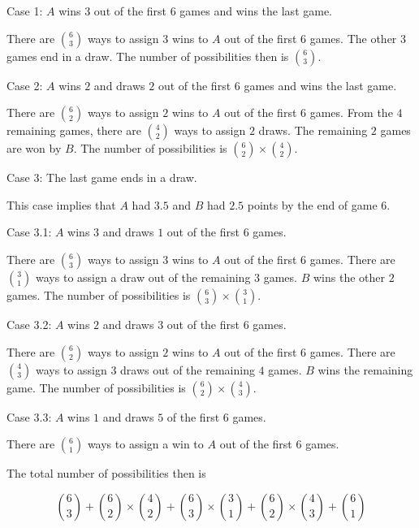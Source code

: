 \begin{enumerate}[label=(\alph*)]
  Case 1: $A$ wins $3$ out of the first $6$ games and wins the last game.
  
  There are ${6 \choose 3}$ ways to assign $3$ wins to $A$ out of the first $6$ games. The other $3$ games end in a draw. The number of possibilities then is ${6 \choose 3}$.
  
  Case 2: $A$ wins $2$ and draws $2$ out of the first $6$ games and wins the last game.
  
  There are ${6 \choose 2}$ ways to assign $2$ wins to $A$ out of the first $6$ games. From the $4$ remaining games, there are ${4 \choose 2}$ ways to assign $2$ draws. The remaining $2$ games are won by $B$. The number of possibilities is ${6 \choose 2} \times {4 \choose 2}$.
  
  Case 3: The last game ends in a draw.
  
  This case implies that $A$ had $3.5$ and $B$ had $2.5$ points by the end of game $6$.
  
  Case 3.1: $A$ wins $3$ and draws $1$ out of the first $6$ games.
  
  There are ${6 \choose 3}$ ways to assign $3$ wins to $A$ out of the first $6$ games. There are ${3 \choose 1}$ ways to assign a draw out of the remaining $3$ games. $B$ wins the other $2$ games. The number of possibilities is ${6 \choose 3} \times {3 \choose 1}$.
  
  Case 3.2: $A$ wins $2$ and draws $3$ out of the first $6$ games.
   
  There are ${6 \choose 2}$ ways to assign $2$ wins to $A$ out of the first $6$ games. There are ${4 \choose 3}$ ways to assign $3$ draws out of the remaining $4$ games. $B$ wins the remaining game. The number of possibilities is ${6 \choose 2} \times {4 \choose 3}$.
  
  Case 3.3: $A$ wins $1$ and draws $5$ of the first $6$ games.
  
  There are ${6 \choose 1}$ ways to assign a win to $A$ out of the first $6$ games.
  
  The total number of possibilities then is
  
  $$ {6 \choose 3} + {6 \choose 2} \times {4 \choose 2} + {6 \choose 3} \times {3 \choose 1} + {6 \choose 2} \times {4 \choose 3} + {6 \choose 1}$$
\end{enumerate}